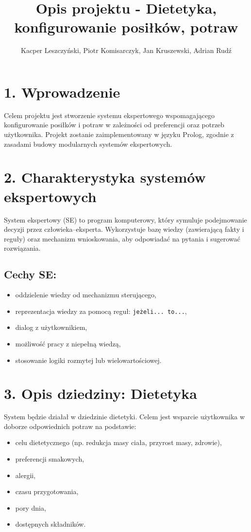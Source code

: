 \documentclass{article}
\title{Opis projektu - Dietetyka, konfigurowanie posiłków, potraw}
\author{Kacper Leszczyński, Piotr Komisarczyk, Jan Kruszewski, Adrian Rudź}
\begin{document}
\maketitle

\section*{1. Wprowadzenie}
Celem projektu jest stworzenie systemu ekspertowego wspomagającego konfigurowanie posiłków i potraw w zależności od preferencji oraz potrzeb użytkownika. Projekt zostanie zaimplementowany w języku Prolog, zgodnie z zasadami budowy modularnych systemów ekspertowych.

\section*{2. Charakterystyka systemów ekspertowych}
System ekspertowy (SE) to program komputerowy, który symuluje podejmowanie decyzji przez człowieka–eksperta. Wykorzystuje bazę wiedzy (zawierającą fakty i reguły) oraz mechanizm wnioskowania, aby odpowiadać na pytania i sugerować rozwiązania.

\subsection*{Cechy SE:}
\begin{itemize}
  \item oddzielenie wiedzy od mechanizmu sterującego,
  \item reprezentacja wiedzy za pomocą reguł: \texttt{jeżeli... to...},
  \item dialog z użytkownikiem,
  \item możliwość pracy z niepełną wiedzą,
  \item stosowanie logiki rozmytej lub wielowartościowej.
\end{itemize}

\section*{3. Opis dziedziny: Dietetyka}
System będzie działał w dziedzinie dietetyki. Celem jest wsparcie użytkownika w doborze odpowiednich potraw na podstawie:
\begin{itemize}
  \item celu dietetycznego (np. redukcja masy ciała, przyrost masy, zdrowie),
  \item preferencji smakowych,
  \item alergii,
  \item czasu przygotowania,
  \item pory dnia,
  \item dostępnych składników.
\end{itemize}
\end{document}
